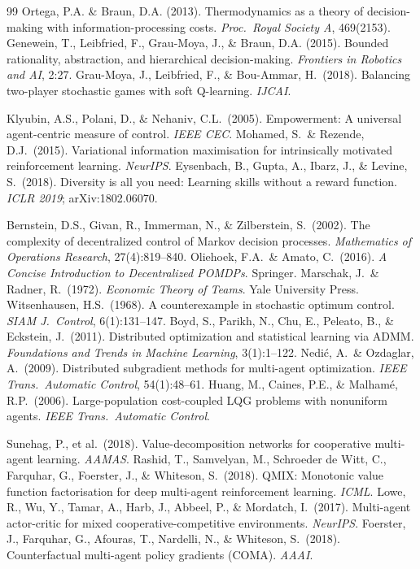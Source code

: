 \documentclass[10pt, letterpaper]{article}
\begin{document}
\begin{thebibliography}{99}
 Ortega, P.A. \& Braun, D.A. (2013). Thermodynamics as a theory of decision-making with information-processing costs. \emph{Proc.\ Royal Society A}, 469(2153).
 Genewein, T., Leibfried, F., Grau-Moya, J., \& Braun, D.A. (2015). Bounded rationality, abstraction, and hierarchical decision-making. \emph{Frontiers in Robotics and AI}, 2:27.
 Grau-Moya, J., Leibfried, F., \& Bou-Ammar, H.\ (2018). Balancing two-player stochastic games with soft Q-learning. \emph{IJCAI}.

 Klyubin, A.S., Polani, D., \& Nehaniv, C.L.\ (2005). Empowerment: A universal agent-centric measure of control. \emph{IEEE CEC}.
 Mohamed, S.\ \& Rezende, D.J.\ (2015). Variational information maximisation for intrinsically motivated reinforcement learning. \emph{NeurIPS}.
 Eysenbach, B., Gupta, A., Ibarz, J., \& Levine, S.\ (2018). Diversity is all you need: Learning skills without a reward function. \emph{ICLR 2019}; arXiv:1802.06070.

 Bernstein, D.S., Givan, R., Immerman, N., \& Zilberstein, S.\ (2002). The complexity of decentralized control of Markov decision processes. \emph{Mathematics of Operations Research}, 27(4):819--840.
 Oliehoek, F.A.\ \& Amato, C.\ (2016). \emph{A Concise Introduction to Decentralized POMDPs}. Springer.
 Marschak, J.\ \& Radner, R.\ (1972). \emph{Economic Theory of Teams}. Yale University Press.
 Witsenhausen, H.S.\ (1968). A counterexample in stochastic optimum control. \emph{SIAM J.\ Control}, 6(1):131--147.
 Boyd, S., Parikh, N., Chu, E., Peleato, B., \& Eckstein, J.\ (2011). Distributed optimization and statistical learning via ADMM. \emph{Foundations and Trends in Machine Learning}, 3(1):1--122.
 Nedi\'c, A.\ \& Ozdaglar, A.\ (2009). Distributed subgradient methods for multi-agent optimization. \emph{IEEE Trans.\ Automatic Control}, 54(1):48--61.
 Huang, M., Caines, P.E., \& Malham\'e, R.P.\ (2006). Large-population cost-coupled LQG problems with nonuniform agents. \emph{IEEE Trans.\ Automatic Control}.

 Sunehag, P., et al.\ (2018). Value-decomposition networks for cooperative multi-agent learning. \emph{AAMAS}.
 Rashid, T., Samvelyan, M., Schroeder de Witt, C., Farquhar, G., Foerster, J., \& Whiteson, S.\ (2018). QMIX: Monotonic value function factorisation for deep multi-agent reinforcement learning. \emph{ICML}.
 Lowe, R., Wu, Y., Tamar, A., Harb, J., Abbeel, P., \& Mordatch, I.\ (2017). Multi-agent actor-critic for mixed cooperative-competitive environments. \emph{NeurIPS}.
 Foerster, J., Farquhar, G., Afouras, T., Nardelli, N., \& Whiteson, S.\ (2018). Counterfactual multi-agent policy gradients (COMA). \emph{AAAI}.


\end{thebibliography}
\end{document}
